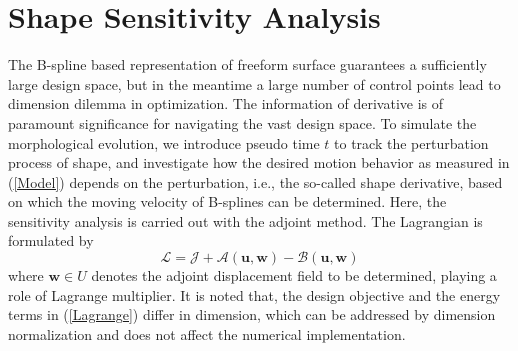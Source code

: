 \documentclass[journal]{IEEEtran}
\renewcommand{\vec}[1]{\mathbf{#1}}
\theoremstyle{definition}
\renewcommand{\vec}[1]{\mathbf{#1}}
\begin{document}


\section{Shape Sensitivity Analysis}
The B-spline based representation of freeform surface guarantees a sufficiently large design space, but in the meantime a large number of control points lead to dimension dilemma in optimization. The information of derivative is of paramount significance for navigating the vast design space. To simulate the morphological evolution, we introduce pseudo time $t$ to track the perturbation process of shape, and investigate how the desired motion behavior as measured in (\ref{Model}) depends on the perturbation, i.e., the so-called shape derivative, based on which the moving velocity of B-splines can be determined. Here, the sensitivity analysis is carried out with the adjoint method. The Lagrangian is formulated by
\begin{equation}\label{Lagrange}
  \mathcal{L}=\mathcal{J}+\mathcal{A}(\vec{u}, \vec{w})-\mathcal{B}(\vec{u}, \vec{w})
\end{equation}
where $\vec{w}\in{U}$ denotes the adjoint displacement field to be determined, playing a role of Lagrange multiplier. It is noted that, the design objective and the energy terms in (\ref{Lagrange}) differ in dimension, which can be addressed by dimension normalization and does not affect the numerical implementation.
\end{document}
